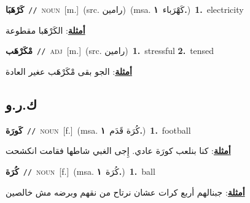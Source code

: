 \documentclass[10pt,a4paper,twoside]{article} %
\begin{document}
\begin{multicols}{2}
{\setlength\topsep{0pt}\textbf{\foreignlanguage{arabic}{كَرْهَبَا}}\ {\color{gray}\texttt{//}\color{black}}\ \textsc{noun}\ [m.]\ (src. \color{gray}\foreignlanguage{arabic}{رامين}\color{black})\ \color{gray}(msa. \foreignlanguage{arabic}{كَهْرَباء}~\foreignlanguage{arabic}{\textbf{١.}})\color{black}\ \textbf{1.}~electricity\  \begin{flushright}\color{gray}\foreignlanguage{arabic}{\textbf{\underline{\foreignlanguage{arabic}{أمثلة}}}: الكَرْهَبا مقطوعة}\end{flushright}\color{black}} \vspace{2mm}

{\setlength\topsep{0pt}\textbf{\foreignlanguage{arabic}{مْكَرْهَب}}\ {\color{gray}\texttt{//}\color{black}}\ \textsc{adj}\ [m.]\ (src. \color{gray}\foreignlanguage{arabic}{رامين}\color{black})\ \textbf{1.}~stressful  \textbf{2.}~tensed\  \begin{flushright}\color{gray}\foreignlanguage{arabic}{\textbf{\underline{\foreignlanguage{arabic}{أمثلة}}}: الجو بقى مْكَرْهَب عغير العادة}\end{flushright}\color{black}} \vspace{2mm}

\vspace{-3mm}
\subsection*{\color{blue}\foreignlanguage{arabic}{ك.ر.و}\color{blue}{}} 

{\setlength\topsep{0pt}\textbf{\foreignlanguage{arabic}{كَورَة}}\ {\color{gray}\texttt{//}\color{black}}\ \textsc{noun}\ [f.]\ \color{gray}(msa. \foreignlanguage{arabic}{كُرَة قَدَم}~\foreignlanguage{arabic}{\textbf{١.}})\color{black}\ \textbf{1.}~football\  \begin{flushright}\color{gray}\foreignlanguage{arabic}{\textbf{\underline{\foreignlanguage{arabic}{أمثلة}}}: كنا بنلعب كورَة عادي. إِجى الغبي شاطها فقامت انكشحت}\end{flushright}\color{black}} \vspace{2mm}

{\setlength\topsep{0pt}\textbf{\foreignlanguage{arabic}{كُرَة}}\ {\color{gray}\texttt{//}\color{black}}\ \textsc{noun}\ [f.]\ \color{gray}(msa. \foreignlanguage{arabic}{كُرَة}~\foreignlanguage{arabic}{\textbf{١.}})\color{black}\ \textbf{1.}~ball\  \begin{flushright}\color{gray}\foreignlanguage{arabic}{\textbf{\underline{\foreignlanguage{arabic}{أمثلة}}}: جبنالهم أربع كرات عشان نرتاح من نقهم وبرضه مش خالصين}\end{flushright}\color{black}} \vspace{2mm}


\end{multicols}
\end{document}

